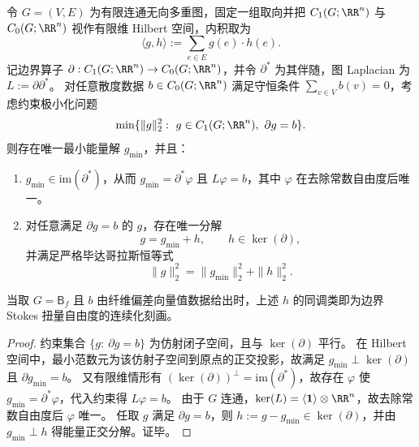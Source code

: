 
\begin{corollary}\label{cor:fold-boundary-hodge-stokes-orthogonal-vector}
令 \(G=(V,E)\) 为有限连通无向多重图，固定一组取向并把 \(C_1(G;\RR^n)\) 与 \(C_0(G;\RR^n)\) 视作有限维 Hilbert 空间，内积取为
\[
\langle g,h\rangle:=\sum_{e\in E} g(e)\cdot h(e).
\]
记边界算子 \(\partial:C_1(G;\RR^n)\to C_0(G;\RR^n)\)，并令 \(\partial^\ast\) 为其伴随，图 Laplacian 为 \(L:=\partial\partial^\ast\)。
对任意散度数据 \(b\in C_0(G;\RR^n)\) 满足守恒条件 \(\sum_{v\in V} b(v)=0\)，考虑约束极小化问题
\[
\min\{\|g\|_2^2:\ g\in C_1(G;\RR^n),\ \partial g=b\}.
\]
则存在唯一最小能量解 \(g_{\min}\)，并且：
\begin{enumerate}
  \item \(g_{\min}\in \mathrm{im}(\partial^\ast)\)，从而 \(g_{\min}=\partial^\ast\varphi\) 且 \(L\varphi=b\)，其中 \(\varphi\) 在去除常数自由度后唯一。
  \item 对任意满足 \(\partial g=b\) 的 \(g\)，存在唯一分解
  \[
  g=g_{\min}+h,
  \qquad h\in \ker(\partial),
  \]
  并满足严格毕达哥拉斯恒等式
  \[
  \|g\|_2^2=\|g_{\min}\|_2^2+\|h\|_2^2.
  \]
\end{enumerate}
当取 \(G=\mathsf B_f\) 且 \(b\) 由纤维偏差向量值数据给出时，上述 \(h\) 的同调类即为边界 Stokes 扭量自由度的连续化刻画。
\end{corollary}
\begin{proof}
约束集合 \(\{g:\ \partial g=b\}\) 为仿射闭子空间，且与 \(\ker(\partial)\) 平行。
在 Hilbert 空间中，最小范数元为该仿射子空间到原点的正交投影，故满足
\(
g_{\min}\perp \ker(\partial)
\)
且 \(\partial g_{\min}=b\)。
又有限维情形有 \((\ker(\partial))^\perp=\mathrm{im}(\partial^\ast)\)，故存在 \(\varphi\) 使 \(g_{\min}=\partial^\ast\varphi\)，代入约束得 \(L\varphi=b\)。
由于 \(G\) 连通，\(\ker(L)=\langle \mathbf 1\rangle\otimes\RR^n\)，故去除常数自由度后 \(\varphi\) 唯一。
任取 \(g\) 满足 \(\partial g=b\)，则 \(h:=g-g_{\min}\in\ker(\partial)\)，并由 \(g_{\min}\perp h\) 得能量正交分解。证毕。
\end{proof}

\endinput
